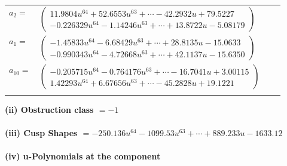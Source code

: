 \documentclass[1p]{elsarticle_modified}
\theoremstyle{definition}
\begin{document}
\begin{tabular}{m{7pt} m{180pt} m{7pt} m{180pt} }
\flushright $a_{2}=$&$\begin{pmatrix}11.9804 u^{64}+52.6553 u^{63}+\cdots-42.2932 u+79.5227\\-0.226329 u^{64}-1.14246 u^{63}+\cdots+13.8722 u-5.08179\end{pmatrix}$ \\
\flushright $a_{1}=$&$\begin{pmatrix}-1.45833 u^{64}-6.68429 u^{63}+\cdots+28.8135 u-15.0633\\-0.990343 u^{64}-4.72668 u^{63}+\cdots+42.1137 u-15.6350\end{pmatrix}$ \\
\flushright $a_{10}=$&$\begin{pmatrix}-0.205715 u^{64}-0.764176 u^{63}+\cdots-16.7041 u+3.00115\\1.42293 u^{64}+6.67656 u^{63}+\cdots-45.2828 u+19.1221\end{pmatrix}$\\&\end{tabular}
\flushleft \textbf{(ii) Obstruction class $= -1$}\\~\\
\flushleft \textbf{(iii) Cusp Shapes $= -250.136 u^{64}-1099.53 u^{63}+\cdots+889.233 u-1633.12$}\\~\\
\newpage\renewcommand{\arraystretch}{1}
\flushleft \textbf{(iv) u-Polynomials at the component}\newline \\
\end{document}
